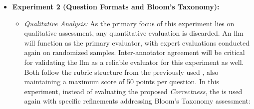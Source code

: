 \begin{itemize}
    \pagebreak

    \item \textbf{Experiment 2 (Question Formats and Bloom's Taxonomy):}
    \begin{itemize}
        \item \textit{Qualitative Analysis:} As the primary focus of this experiment lies on qualitative assessment, any quantitative evaluation is discarded. An \ac{llm} will function as the primary evaluator, with expert evaluations conducted again on randomized samples. Inter-annotator agreement will be critical for validating the \ac{llm} as a reliable evaluator for this experiment as well. Both follow the rubric structure from the previously used \cite{mi_comparative_2024}, also maintaining a maximum score of 50 points per question. In this experiment, instead of evaluating the proposed \textit{Correctness}, the  is used again with specific refinements addressing Bloom's Taxonomy assessment:


\end{itemize}
\end{itemize}
